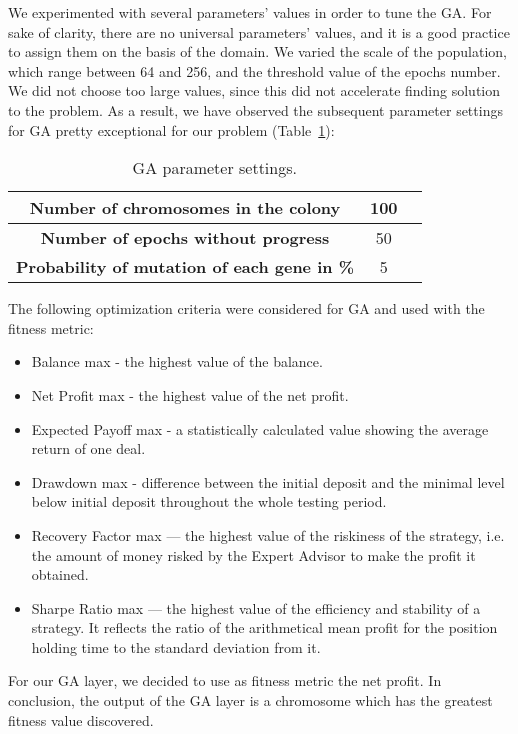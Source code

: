 We experimented with several parameters' values in order to tune the GA. For sake of clarity, there are no universal parameters' values, and it is a good practice to assign them on the basis of the domain. We varied the scale of the population, which range between 64 and 256, and the threshold value of the epochs number. We did not choose too large values, since this did not accelerate finding solution to the problem. 
As a result, we have observed the subsequent parameter settings for GA pretty exceptional for our problem (Table~\ref{tab:GAPS}):

\begin{table}[htb]
\centering
\begin{tabular}{|c|c|c|}
\hline 
\textbf{Number of chromosomes in the colony} & 100 \\ 
\hline 
\textbf{Number of epochs without progress} &  50\\ 
\hline 
\textbf{Probability of mutation of each gene in \%} &  5\\  
\hline 
\end{tabular} 
\caption{\label{tab:GAPS}GA parameter settings.}
\end{table}


The following optimization criteria were considered for GA and used with the fitness metric:
\begin{itemize}
\setlength\itemsep{0.3em}
\item Balance max - the highest value of the balance.
\item Net Profit max - the highest value of the net profit.
\item Expected Payoff max - a statistically calculated value showing the average return of one deal.
\item Drawdown max - difference between the initial deposit and the minimal level below initial deposit throughout the whole testing period.
\item Recovery Factor max — the highest value of the riskiness of the strategy, i.e. the amount of money risked by the Expert Advisor to make the profit it obtained.
\item Sharpe Ratio max — the highest value of the efficiency and stability of a strategy. It reflects the ratio of the arithmetical mean profit for the position holding time to the standard deviation from it.
\end{itemize}

For our GA layer, we decided to use as fitness metric the net profit.
In conclusion, the output of the GA layer is a chromosome which has the greatest fitness value discovered.
